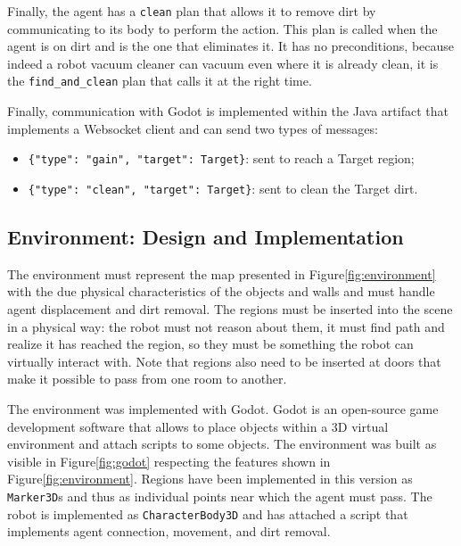 Finally, the agent has a \texttt{clean} plan that allows it to remove dirt by communicating to its body to perform the action.
This plan is called when the agent is on dirt and is the one that eliminates it.
It has no preconditions, because indeed a robot vacuum cleaner can vacuum even where it is already clean, it is the \texttt{find\_and\_clean} plan that calls it at the right time.

Finally, communication with Godot is implemented within the Java artifact that implements a Websocket client and can send two types of messages:
\begin{itemize}
    \item \lstinline|{"type": "gain", "target": Target}|: sent to reach a Target region;
    \item \lstinline|{"type": "clean", "target": Target}|: sent to clean the Target dirt.
\end{itemize}

\subsection{Environment: Design and Implementation}
The environment must represent the map presented in Figure\ref{fig:environment} with the due physical characteristics of the objects and walls and must handle agent displacement and dirt removal.
The regions must be inserted into the scene in a physical way: the robot must not reason about them, it must find path and realize it has reached the region, so they must be something the robot can virtually interact with.
Note that regions also need to be inserted at doors that make it possible to pass from one room to another.

The environment was implemented with Godot.
Godot is an open-source game development software that allows to place objects within a 3D virtual environment and attach scripts to some objects.
The environment was built as visible in Figure\ref{fig:godot} respecting the features shown in Figure\ref{fig:environment}.
Regions have been implemented in this version as \texttt{Marker3D}s and thus as individual points near which the agent must pass.
The robot is implemented as \texttt{CharacterBody3D} and has attached a script that implements agent connection, movement, and dirt removal.

